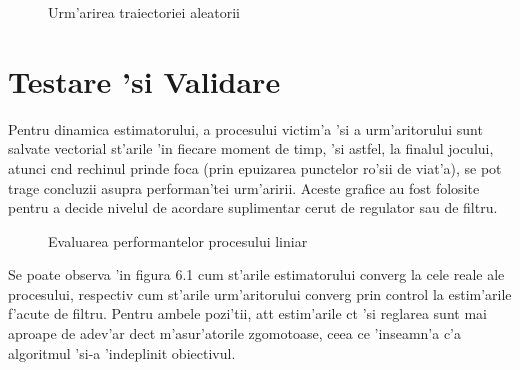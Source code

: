 \documentclass[12pt,a4paper,twoside]{report}
\begin{document}
\begin{figure}[H]
    \hspace*{-3cm}
    \qquad
    \caption{Urm'arirea traiectoriei aleatorii}%
\end{figure}




\chapter{Testare 'si Validare}
\label{ch:testing}

Pentru dinamica estimatorului, a procesului victim'a 'si a urm'aritorului sunt salvate vectorial st'arile 'in fiecare moment de timp, 'si astfel, la finalul jocului, atunci c\ia nd rechinul prinde foca (prin epuizarea punctelor ro'sii de viat'a), se pot trage concluzii asupra performan'tei urm'aririi. Aceste grafice au fost folosite pentru a decide nivelul de acordare suplimentar cerut de regulator sau de filtru. 


\begin{figure}[h]
\hspace*{-5cm}
 
 \caption{Evaluarea performantelor procesului liniar}
\end{figure}

Se poate observa 'in figura 6.1 cum st'arile estimatorului converg la cele reale ale procesului, respectiv cum st'arile urm'aritorului converg prin control la estim'arile f'acute de filtru. Pentru ambele pozi'tii, at\ia t estim'arile c\ia t 'si reglarea sunt mai aproape de adev'ar dec\ia t m'asur'atorile zgomotoase, ceea ce 'inseamn'a c'a algoritmul 'si-a 'indeplinit obiectivul. 
\end{document}
